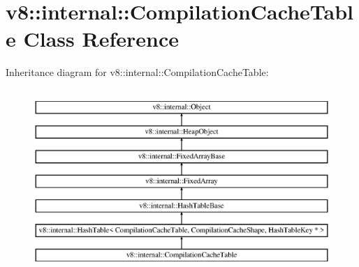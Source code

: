 \hypertarget{classv8_1_1internal_1_1_compilation_cache_table}{}\section{v8\+:\+:internal\+:\+:Compilation\+Cache\+Table Class Reference}
\label{classv8_1_1internal_1_1_compilation_cache_table}
Inheritance diagram for v8\+:\+:internal\+:\+:Compilation\+Cache\+Table\+:\begin{figure}[H]
\begin{center}
\leavevmode
\includegraphics[height=7.000000cm]{classv8_1_1internal_1_1_compilation_cache_table}
\end{center}
\end{figure}
